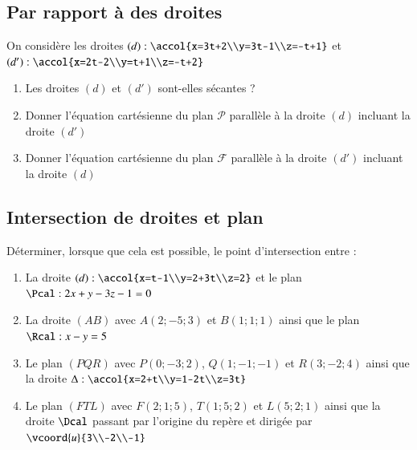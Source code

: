 \documentclass[oneside,12pt]{article}          %
\begin{document}
\subsection{Par rapport à des droites}
On considère les droites $(d):\accol{x=3t+2\\y=3t-1\\z=-t+1}$ et $(d'):\accol{x=2t-2\\y=t+1\\z=-t+2}$
\begin{enumerate}
    \item Les droites $(d)$ et $(d')$ sont-elles sécantes ?
    \item Donner l'équation cartésienne du plan $\mathscr{P}$ parallèle à la droite $(d)$ incluant la droite $(d')$
    \item Donner l'équation cartésienne du plan $\mathscr{F}$ parallèle à la droite $(d')$ incluant la droite $(d)$
\end{enumerate}



\subsection{Intersection de droites et plan}
Déterminer, lorsque que cela est possible, le point d'intersection entre :
\begin{enumerate}
	\item La droite $(d):\accol{x=t-1\\y=2+3t\\z=2}$ et le plan $\Pcal : 2x+y-3z-1=0$
	\item La droite $(AB)$ avec $A(2;-5;3)$ et $B(1;1;1)$ ainsi que le plan $\Rcal :x-y=5$
	\item Le plan $(PQR)$ avec $P(0;-3;2)$, $Q(1;-1;-1)$ et $R(3;-2;4)$ ainsi que la droite $\Delta :\accol{x=2+t\\y=1-2t\\z=3t}$
	\item Le plan $(FTL)$ avec $F(2;1;5)$, $T(1;5;2)$ et $L(5;2;1)$ ainsi que la droite $\Dcal$ passant par l'origine du repère et dirigée par $\vcoord{u}{3\\-2\\-1}$
\end{enumerate}
\end{document}
